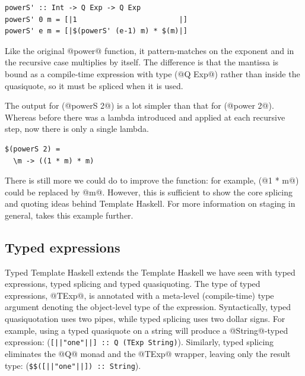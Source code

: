 \begin{lstlisting}
powerS' :: Int -> Q Exp -> Q Exp
powerS' 0 m = [|1                        |]
powerS' e m = [|$(powerS' (e-1) m) * $(m)|]
\end{lstlisting}

Like the original @power@ function, it pattern-matches on the exponent and in the recursive case multiplies by itself.
The difference is that the mantissa is bound as a compile-time expression with type (@Q Exp@) rather than inside the quasiquote, so it must be spliced when it is used.

The output for (@powerS 2@) is a lot simpler than that for (@power 2@).
Whereas before there was a lambda introduced and applied at each recursive step, now there is only a single lambda.

\begin{lstlisting}
$(powerS 2) =
  \m -> ((1 * m) * m)
\end{lstlisting}

There is still more we could do to improve the function: for example, (@1 * m@) could be replaced by @m@.
However, this is sufficient to show the core splicing and quoting ideas behind Template Haskell.
For more information on staging in general, \citet{rompf2010lightweight} takes this example further.

\subsection{Typed expressions}


Typed Template Haskell extends the Template Haskell we have seen with typed expressions, typed splicing and typed quasiquoting.
The type of typed expressions, @TExp@, is annotated with a meta-level (compile-time) type argument denoting the object-level type of the expression.
Syntactically, typed quasiquotation uses two pipes, while typed splicing uses two dollar signs.
For example, using a typed quasiquote on a string will produce a @String@-typed expression: (\lstinline/[||"one"||] :: Q (TExp String)/).
Similarly, typed splicing eliminates the @Q@ monad and the @TExp@ wrapper, leaving only the result type: (\lstinline/$$([||"one"||]) :: String/).

